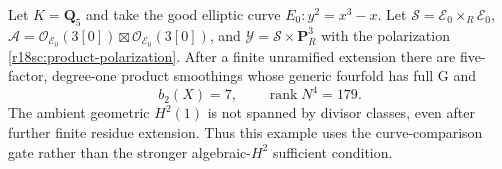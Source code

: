 \begin{proposition}
\label{r18sc:elliptic-example}
Let $K=\mathbf Q_5$ and take the good
elliptic curve $E_0:y^2=x^3-x$.
Let $\mathcal S=\mathcal E_0\times_R\mathcal E_0$,
$\mathcal A=\mathcal O_{\mathcal E_0}(3[0])
\boxtimes\mathcal O_{\mathcal E_0}(3[0])$,
and $\mathcal Y=\mathcal S\times\mathbf P_R^3$
with the polarization \eqref{r18sc:product-polarization}.
After a finite unramified extension there are
five-factor, degree-one product smoothings
whose generic fourfold has full G and
\[
             b_2(X)=7,\qquad\operatorname{rank}N^4=179.
 \tag{SC18.8}\label{r18sc:example-invariants}
\]
The ambient geometric $H^2(1)$ is not spanned
by divisor classes, even after further finite
residue extension.  Thus this example uses
the curve-comparison gate rather than the
stronger algebraic-$H^2$ sufficient condition.
\end{proposition}

